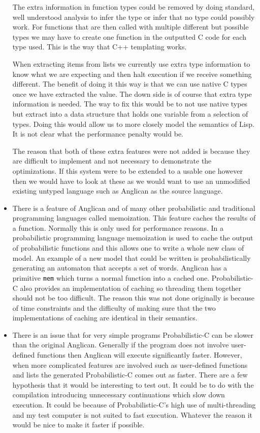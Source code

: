 \documentclass[a4paper]{article}
\begin{document}
\begin{itemize}
	The extra information in function types could be removed by doing standard, well understood analysis to infer the type or infer that no type could possibly work. For functions that are then called with multiple different but possible types we may have to create one function in the outputted C code for each type used. This is the way that C++ templating works.

	When extracting items from lists we currently use extra type information to know what we are expecting and then halt execution if we receive something different. The benefit of doing it this way is that we can use native C types once we have extracted the value. The down side is of course that extra type information is needed. The way to fix this would be to not use native types but extract into a data structure that holds one variable from a selection of types. Doing this would allow us to more closely model the semantics of Lisp. It is not clear what the performance penalty would be.

	The reason that both of these extra features were not added is because they are difficult to implement and not necessary to demonstrate the optimizations. If this system were to be extended to a usable one however then we would have to look at these as we would want to use an unmodified existing untyped language such as Anglican as the source language.

\item
	There is a feature of Anglican and of many other probabilistic and traditional programming languages called memoization. This feature caches the results of a function. Normally this is only used for performance reasons. In a probabilistic programming language memoization is used to cache the output of probabilistic functions and this allows one to write a whole new class of model. An example of a new model that could be written is probabilistically generating an automaton that accepts a set of words. Anglican has a primitive \texttt{mem} which turns a normal function into a cached one. Probabilistic-C also provides an implementation of caching so threading them together should not be too difficult. The reason this was not done originally is because of time constraints and the difficulty of making sure that the two implementations of caching are identical in their semantics.

\item
	There is an issue that for very simple programs Probabilistic-C can be slower than the original Anglican. Generally if the program does not involve user-defined functions then Anglican will execute significantly faster. However, when more complicated features are involved such as user-defined functions and lists the generated Probabilistic-C comes out as faster. There are a few hypothesis that it would be interesting to test out. It could be to do with the compilation introducing unnecessary continuations which slow down execution. It could be because of Probabilistic-C's high use of multi-threading and my test computer is not suited to fast execution. Whatever the reason it would be nice to make it faster if possible.

\end{itemize}
\end{document}
